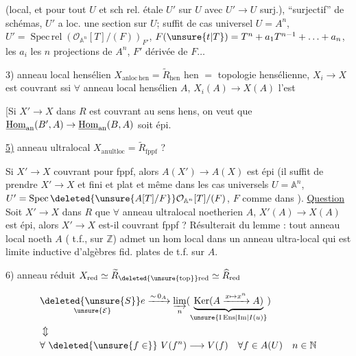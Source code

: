 (local, et pour tout $U$ et sch rel. étale $U'$ sur $U$ avec $U'\to U$  surj.),
``surjectif'' de schémas,  $U'$ a loc. une section sur $U$;
suffit de cas universel $U=A^n$, $U'=\operatorname{Spec\,rel}(\mathcal O_{\mathbb A^n}[T]/(F))_{F'}$,
$F(\unsure{t|T})=T^n+a_1T^{n-1}+\ldots+a_n$, les $a_i$ les $n$ projections de $A^n$, $F'$ dérivée de $F\ldots$

3) anneau local hensélien \quad $X_{\mathrm{anloc\,hen}}=\widetilde R_{\mathrm{hen}}$ \quad hen $=$ topologie hensélienne,
$X_i\to X$ est couvrant ssi $\forall$ anneau local hensélien $A$, $X_i(A)\to X(A)$ l'est

[Si $X'\to X$ dans $R$ est couvrant  au sens hens, on veut que
$\underline{\operatorname{Hom}}_{\rm an}(B',A)\to\underline{\operatorname{Hom}}_{\rm an}(B,A)$ soit épi.

\uline{5)} anneau ultralocal \quad $X_{\mathrm{anultloc}}=\widetilde R_{\mathrm{fppf}}$ \quad ?

Si $X'\to X$  couvrant pour fppf,
alors $A(X')\to A(X)$ est épi (il suffit de prendre $X'\to X$  et  fini et plat
et même dans les cas universels $U=\mathbb A^n$, $U'=\operatorname{Spec}\deleted{\unsure{A[T]/F}}\mathcal O_{\mathbb A^n}[T]/(F)$, $F$ comme dans ).
\uline{Question} Soit $X'\to X$ dans $R$  que $\forall$ anneau ultralocal noetherien $A$,
$X'(A)\to X(A)$ est épi, alors $X'\to X$ est-il couvrant fppf ? Résulterait du lemme : tout anneau local noeth $A$
( t.f., sur $\mathbb Z$) admet un hom local dans un anneau ultra-local qui est limite inductive d'algèbres fid. plates de t.f. sur $A$.

6) anneau réduit \quad $X_{\rm red}\simeq\widetilde R_{\deleted{\unsure{\rm top}}\rm red}\simeq\widehat R_{\rm red}$

\[
\begin{aligned}
&\underset{\unsure{\mathcal E}}{\deleted{\unsure{S}}e}
 \xrightarrow[\ ]{\sim\,0_A}\varinjlim_n
 (\underbrace{\operatorname{Ker}(A\xrightarrow{x\mapsto x^n} A)}_{\unsure{\mathrm{I\,Ens}|\mathrm{Im}|I(u)}})\\
&\Updownarrow\\
&\forall\ \deleted{\unsure{f\in}}\ V(f^n)\longrightarrow V(f)\quad \forall f\in A(U)\quad n\in\mathbb N
\end{aligned}
\]

